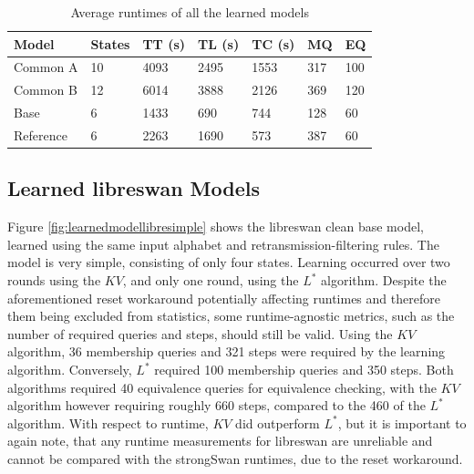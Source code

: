 \begin{table}[h]
	\centering
	\begin{tabular}{|l|l|l|l|l|l|l|}
		\hline
		\rowcolor[HTML]{C0C0C0} 
		Model     & States & TT (s)   & TL (s)   	  & TC (s)   & MQ  & EQ  \\ \hline
		Common A  & 10     & 4093 	  & 2495	 	  & 1553 	 & 317 & 100 \\ \hline
		Common B  & 12     & 6014 	  & 3888		  & 2126 	 & 369 & 120 \\ \hline
		Base      & 6      & 1433 	  & 690 		  & 744  	 & 128 & 60  \\ \hline
		Reference & 6      & 2263 	  & 1690		  & 573  	 & 387 & 60  \\ \hline
	\end{tabular}
	\caption{Average runtimes of all the learned models}
	\label{tab:runtime_summary_averages}
\end{table}

\subsection{Learned libreswan Models}
Figure \ref{fig:learnedmodellibresimple} shows the libreswan clean base model, learned using the same input alphabet and retransmission-filtering rules. The model is very simple, consisting of only four states. Learning occurred over two rounds using the $KV$, and only one round, using the $L^*$ algorithm. Despite the aforementioned reset workaround potentially affecting runtimes and therefore them being excluded from statistics, some runtime-agnostic metrics, such as the number of required queries and steps, should still be valid. Using the $KV$ algorithm, 36 membership queries and 321 steps were required by the learning algorithm. Conversely, $L^*$ required 100 membership queries and 350 steps. Both algorithms required 40 equivalence queries for equivalence checking, with the $KV$ algorithm however requiring roughly 660 steps, compared to the 460 of the $L^*$ algorithm. With respect to runtime, $KV$ did outperform $L^*$, but it is important to again note, that any runtime measurements for libreswan are unreliable and cannot be compared with the strongSwan runtimes, due to the reset workaround.

